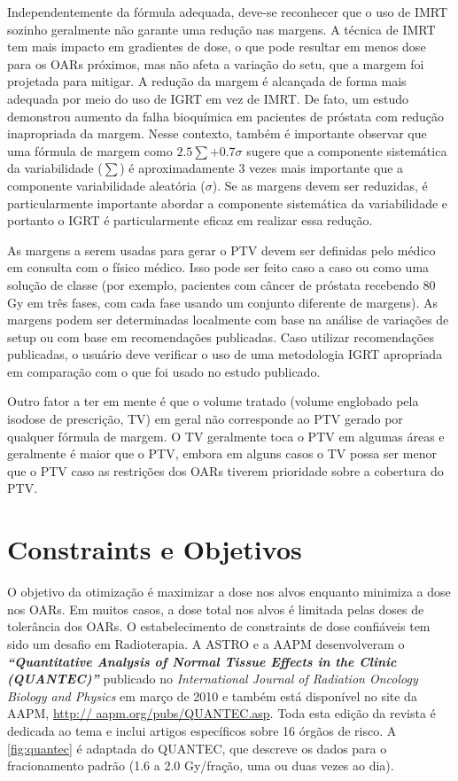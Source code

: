 \documentclass[11pt,a4paper]{article}
\newcounter{exemplo}
\begin{document}
	Independentemente da fórmula adequada, deve-se reconhecer que o uso de IMRT sozinho geralmente não garante uma redução nas margens. A técnica de IMRT tem mais impacto em gradientes de dose, o que pode resultar em menos dose para os OARs próximos, mas não afeta a variação do setu, que a margem foi projetada para mitigar. A redução da margem é alcançada de forma mais adequada por meio do uso de IGRT em vez de IMRT. De fato, um estudo demonstrou aumento da falha bioquímica em pacientes de próstata com redução inapropriada da margem. Nesse contexto, também é importante observar que uma fórmula de margem como $2.5\sum + 0.7\sigma$ sugere que a componente sistemática da variabilidade ($\sum$) é aproximadamente 3 vezes mais importante que a componente variabilidade aleatória ($\sigma$). Se as margens devem ser reduzidas, é particularmente importante abordar a componente sistemática da variabilidade e portanto o IGRT é particularmente eficaz em realizar essa redução.

	As margens a serem usadas para gerar o PTV devem ser definidas pelo médico em consulta com o físico médico. Isso pode ser feito caso a caso ou como uma solução de classe (por exemplo, pacientes com câncer de próstata recebendo 80 Gy em três fases, com cada fase usando um conjunto diferente de margens). As margens podem ser determinadas localmente com base na análise de variações de setup ou com base em recomendações publicadas. Caso utilizar recomendações publicadas, o usuário deve verificar o uso de uma metodologia IGRT apropriada em comparação com o que foi usado no estudo publicado.

	Outro fator a ter em mente é que o volume tratado (volume englobado pela isodose de prescrição, TV) em geral não corresponde ao PTV gerado por qualquer fórmula de margem. O TV geralmente toca o PTV em algumas áreas e geralmente é maior que o PTV, embora em alguns casos o TV possa ser menor que o PTV caso as restrições dos OARs tiverem prioridade sobre a cobertura do PTV.

\section{Constraints e Objetivos}

	O objetivo da otimização é maximizar a dose nos alvos enquanto minimiza a dose nos OARs. Em muitos casos, a dose total nos alvos é limitada pelas doses de tolerância dos OARs. O estabelecimento de constraints de dose confiáveis tem sido um desafio em Radioterapia. A ASTRO  e a AAPM desenvolveram o \textbf{\textit{``Quantitative Analysis of Normal Tissue Effects in the Clinic (QUANTEC)''}} publicado no \textit{International Journal of Radiation Oncology Biology and Physics} em março de 2010 e também está disponível no site da AAPM, \href{http:// aapm.org/pubs/QUANTEC.asp}{http:// aapm.org/pubs/QUANTEC.asp}. Toda esta edição da revista é dedicada ao tema e inclui artigos específicos sobre 16 órgãos de risco. A \ref{fig:quantec} é adaptada do QUANTEC, que descreve os dados para o fracionamento padrão (1.6 a 2.0 Gy/fração, uma ou duas vezes ao dia).
\end{document}
